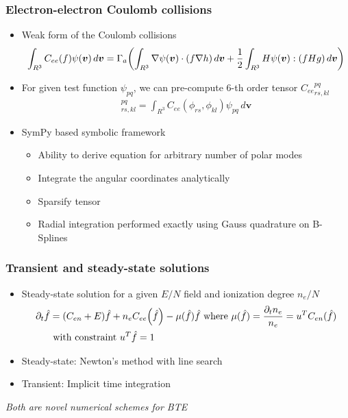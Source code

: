\documentclass[mathserif, aspectratio=169]{beamer}
\newcommand{\vect}[1]{\boldsymbol{#1}}
\newcommand{\of}[1]{\mleft( #1 \mright)}
\newcommand{\diff}[1]{\, d#1}
\begin{document}
\begin{frame}
	\frametitle{Electron-electron Coulomb collisions}
	\begin{itemize}
		\item Weak form of the Coulomb collisions
		\begin{align}
			\int_{R^3} C_{ee}(f) \psi(\vect{v})\diff{\vect{v}} = \Gamma_a \of{\int_{R^3} \nabla \psi\of{\vect{v}} \cdot (f \nabla h ) \diff{\vect{v}}  + \frac{1}{2} \int_{R^3} H\psi\of{\vect{v}} : \of{f H g} \diff{\vect{v}}} 
		\end{align}
		\item For given test function $\psi_{pq}$, we can pre-compute 6-th order tensor ${C_{ee}}_{rs,kl}^{pq}$
		\begin{align}
			[C_{ee}]_{rs,kl}^{pq} = \int_{R^3} C_{ee}(\phi_{rs}, \phi_{kl}) \psi_{pq} \diff{\vect{v}} 
		\end{align}
		\item SymPy based symbolic framework %
		\begin{itemize}
			\item Ability to derive equation for arbitrary number of polar modes
			\item Integrate the angular coordinates analytically %
			\item Sparsify tensor
			\item Radial integration performed exactly using Gauss quadrature on B-Splines
		\end{itemize}
	\end{itemize}
\end{frame}

\begin{frame}
	\frametitle{Transient and steady-state solutions}
	\begin{itemize}
		\item Steady-state solution for a given $E/N$ field and ionization degree $n_e/N$ 
		\begin{align}
			\partial_t {\hat{f}} &=(C_{en}+E)\hat{f} + n_e C_{ee}\of{\hat{f}} - \mu(\hat{f}) \hat{f} \text{ where } \mu(\hat{f}) = \frac{\partial_t n_e}{n_e} = u^T C_{en}(\hat{f})\\
			&\text{ with constraint } u^T \hat{f} = 1 \nonumber 
		\end{align}
		\item Steady-state: Newton's method with line search
		\item Transient: Implicit time integration
	\end{itemize}
	\textit{Both are novel numerical schemes for BTE}
\end{frame}
\end{document}
